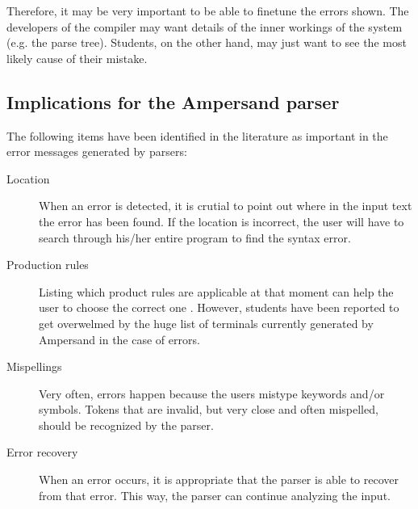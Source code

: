 Therefore, it may be very important to be able to finetune the errors shown.
The developers of the compiler may want details of the inner workings of the system (e.g. the parse tree).
Students, on the other hand, may just want to see the most likely cause of their mistake.

\subsection{Implications for the Ampersand parser}
The following items have been identified in the literature as important in the error messages generated by parsers:
\begin{description}
	\item[Location] When an error is detected, it is crutial to point out where in the input text the error has been found.
		If the location is incorrect, the user will have to search through his/her entire program to find the syntax error.
	\item[Production rules] Listing which product rules are applicable at that moment can help the user to choose the correct one \cite{helium-parser}.
		However, students have been reported to get overwelmed by the huge list of terminals currently generated by Ampersand in the case of errors. 
	\item[Mispellings] Very often, errors happen because the users mistype keywords and/or symbols.
		Tokens that are invalid, but very close and often mispelled, should be recognized by the parser.
	\item[Error recovery] When an error occurs, it is appropriate that the parser is able to recover from that error.
		This way, the parser can continue analyzing the input.
\end{description}
